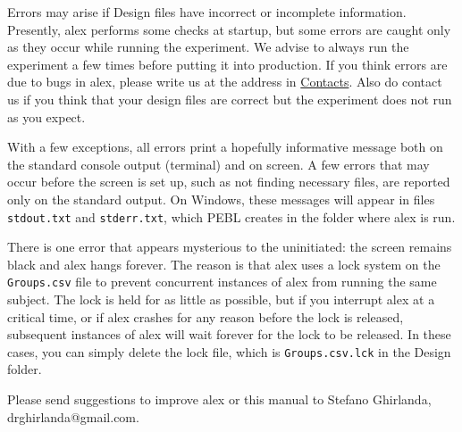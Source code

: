 \documentclass[11pt,]{article}
\begin{document}
Errors may arise if Design files have incorrect or incomplete
information. Presently, alex performs some checks at startup, but some
errors are caught only as they occur while running the experiment. We
advise to always run the experiment a few times before putting it into
production. If you think errors are due to bugs in alex, please write us
at the address in \hyperref[contacts]{Contacts}. Also do contact us if
you think that your design files are correct but the experiment does not
run as you expect.

With a few exceptions, all errors print a hopefully informative message
both on the standard console output (terminal) and on screen. A few
errors that may occur before the screen is set up, such as not finding
necessary files, are reported only on the standard output. On Windows,
these messages will appear in files \texttt{stdout.txt} and
\texttt{stderr.txt}, which PEBL creates in the folder where alex is run.

There is one error that appears mysterious to the uninitiated: the
screen remains black and alex hangs forever. The reason is that alex
uses a lock system on the \texttt{Groups.csv} file to prevent concurrent
instances of alex from running the same subject. The lock is held for as
little as possible, but if you interrupt alex at a critical time, or if
alex crashes for any reason before the lock is released, subsequent
instances of alex will wait forever for the lock to be released. In
these cases, you can simply delete the lock file, which is
\texttt{Groups.csv.lck} in the Design folder.


Please send suggestions to improve alex or this manual to Stefano
Ghirlanda, drghirlanda@gmail.com.
\end{document}
